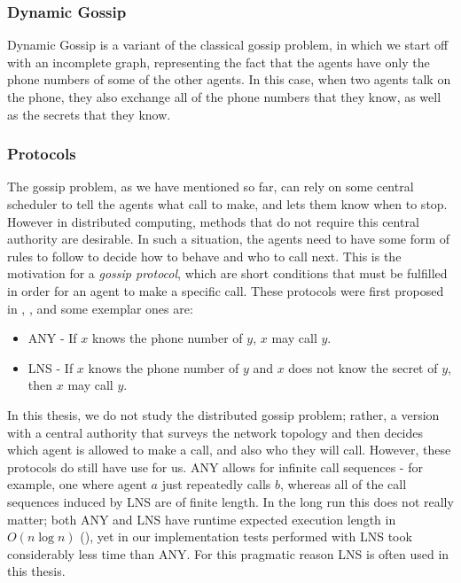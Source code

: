 \documentclass[12pt, a4paper]{article}
\begin{document}
\subsubsection{Dynamic Gossip}

Dynamic Gossip is a variant of the classical gossip problem, in which we start
off with an incomplete graph, representing the fact that the agents have only
the phone numbers of some of the other agents. In this case, when two agents
talk on the phone, they also exchange all of the phone numbers that they know, as
well as the secrets that they know.

\subsubsection{Protocols}
\label{sec:Protocols}

The gossip problem, as we have mentioned so far, can rely on some central
scheduler to tell the agents what call to make, and lets them know when to stop.
However in distributed computing, methods that do not require this central
authority are desirable. In such a situation, the agents need to have some form
of rules to follow to decide how to behave and who to call next. This is the
motivation for a \textit{gossip protocol}, which are short conditions that must
be fulfilled in order for an agent to make a specific call. These protocols were
first proposed in \cite{EPfDG}, \cite{KnowledgeandGossip}, and some exemplar
ones are:

\begin{itemize}
\item \textsf{ANY} - If $x$ knows the phone number of $y$, $x$ may call $y$.
\item \textsf{LNS} - If $x$ knows the phone number of $y$ and $x$ does not
    know the secret of $y$, then $x$ may call $y$.
\end{itemize}

In this thesis, we do not study the distributed gossip problem; rather, a
version with a central authority that surveys the network topology and then
decides which agent is allowed to make a call, and also who they will call.
However, these protocols do still have use for us. \textsf{ANY} allows for
infinite call sequences - for example, one where agent $a$ just repeatedly calls
$b$, whereas all of the call sequences induced by \textsf{LNS} are of finite
length. In the long run this does not really matter; both \textsf{ANY} and
\textsf{LNS} have runtime expected execution length in $O(n \log n)$
(\cite{DynamicGossip}), yet in our implementation tests performed with
\textsf{LNS} took considerably less time than \textsf{ANY}. For this pragmatic
reason \textsf{LNS} is often used in this thesis.
\end{document}
